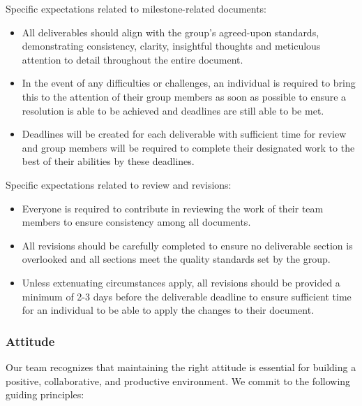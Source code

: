 \documentclass{article}
\begin{document}
Specific expectations related to milestone-related documents:
\begin{itemize}
    \item All deliverables should align with the group’s agreed-upon standards, demonstrating consistency, clarity,
    insightful thoughts and meticulous attention to detail throughout the entire document.
    \item In the event of any difficulties or challenges, an individual is required to bring this to the attention
    of their group members as soon as possible to ensure a resolution is able to be achieved and deadlines are still able to be met.
    \item Deadlines will be created for each deliverable with sufficient time for review and group members will be
    required to complete their designated work to the best of their abilities by these deadlines.
\end{itemize}

Specific expectations related to review and revisions:
\begin{itemize}
    \item Everyone is required to contribute in reviewing the work of their team members to ensure consistency among
    all documents.
    \item All revisions should be carefully completed to ensure no deliverable section is overlooked and all
    sections meet the quality standards set by the group.
    \item Unless extenuating circumstances apply, all revisions should be provided a minimum of 2-3 days before the
    deliverable deadline to ensure sufficient time for an individual to be able to apply the changes to their document.
\end{itemize}

\subsubsection*{Attitude}
Our team recognizes that maintaining the right attitude is essential for
building a positive, collaborative, and productive environment. We commit to
the following guiding principles:
\end{document}
